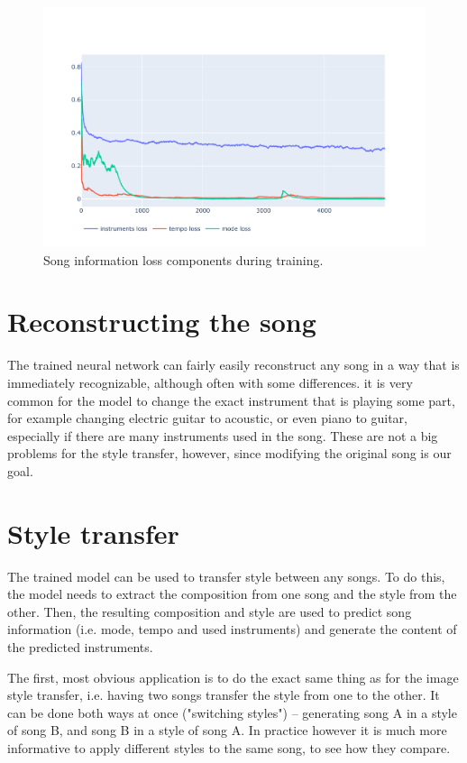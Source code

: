 \documentclass[en]{pracamgr}
\begin{document}
\begin{figure}
    \centering
    \includegraphics[width=\linewidth]{figures/song-info.pdf}
    \caption{Song information loss components during training.}
    \label{fig:song_info}
\end{figure}

\section{Reconstructing the song}

The trained neural network can fairly easily reconstruct any song in a way that is immediately recognizable, although often with some differences.
it is very common for the model to change the exact instrument that is playing some part, for example changing electric guitar to acoustic, or even piano to guitar, especially if there are many instruments used in the song.
These are not a big problems for the style transfer, however, since modifying the original song is our goal.

\section{Style transfer}

The trained model can be used to transfer style between any songs.
To do this, the model needs to extract the composition from one song and the style from the other.
Then, the resulting composition and style are used to predict song information (i.e. mode, tempo and used instruments) and generate the content of the predicted instruments.

The first, most obvious application is to do the exact same thing as for the image style transfer, i.e. having two songs transfer the style from one to the other.
It can be done both ways at once ("switching styles") -- generating song A in a style of song B, and song B in a style of song A.
In practice however it is much more informative to apply different styles to the same song, to see how they compare.
\end{document}
